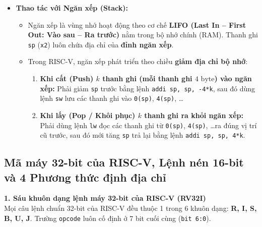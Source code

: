 \begin{itemize}
\begin{itemize}
\begin{itemize}
            \item Khi nhảy không điều kiện (tương đương lệnh giả \texttt{j Label}): Dùng \texttt{jal x0, Label} (hủy địa chỉ trở về vào \texttt{x0}).
        \end{itemize}
        \item \texttt{jalr rd, rs1, imm} (Jump and Link Register): Lưu $\texttt{rd} = PC + 4$ và nhảy tới địa chỉ $PC = \texttt{rs1} + \text{SignExt}(\texttt{imm})$.
        \begin{itemize}
            \item Khi trở về từ chương trình con (tương đương lệnh giả \texttt{ret} hoặc \texttt{jr ra}): Dùng \texttt{jalr x0, ra, 0} (hoặc viết dạng \texttt{jalr x0, 0(ra)}).
        \end{itemize}
    \end{itemize}
    \item \textbf{Thao tác với Ngăn xếp (Stack):}
    \begin{itemize}
        \item Ngăn xếp là vùng nhớ hoạt động theo cơ chế \textbf{LIFO (Last In -- First Out: Vào sau -- Ra trước)} nằm trong bộ nhớ chính (RAM). Thanh ghi \texttt{sp} (\texttt{x2}) luôn chứa địa chỉ của \textbf{đỉnh ngăn xếp}.
        \item Trong RISC-V, ngăn xếp phát triển theo chiều \textbf{giảm địa chỉ bộ nhớ}:
        \begin{enumerate}
            \item \textbf{Khi cất (Push) $k$ thanh ghi (mỗi thanh ghi $4\text{ byte}$) vào ngăn xếp:} Phải giảm \texttt{sp} trước bằng lệnh \texttt{addi sp, sp, -4*k}, sau đó dùng lệnh \texttt{sw} lưu các thanh ghi vào \texttt{0(sp)}, \texttt{4(sp)}, \dots
            \item \textbf{Khi lấy (Pop / Khôi phục) $k$ thanh ghi ra khỏi ngăn xếp:} Phải dùng lệnh \texttt{lw} đọc các thanh ghi từ \texttt{0(sp)}, \texttt{4(sp)}, \dots ra đúng vị trí cũ trước, sau đó mới tăng \texttt{sp} trả lại bằng lệnh \texttt{addi sp, sp, 4*k}.
        \end{enumerate}
    \end{itemize}
\end{itemize}

\subsection{Mã máy 32-bit của RISC-V, Lệnh nén 16-bit và 4 Phương thức định địa chỉ}

\textbf{1. Sáu khuôn dạng lệnh máy 32-bit của RISC-V (RV32I)}\\
Mọi câu lệnh chuẩn 32-bit của RISC-V đều thuộc 1 trong 6 khuôn dạng: \textbf{R, I, S, B, U, J}. Trường \texttt{opcode} luôn cố định ở 7 bit cuối cùng (\texttt{bit 6:0}).

